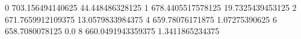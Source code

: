 0 703.156494140625 44.448486328125
1 678.4405517578125 19.7325439453125
2 671.7659912109375 13.0579833984375
4 659.78076171875 1.07275390625
6 658.7080078125 0.0
8 660.0491943359375 1.3411865234375
